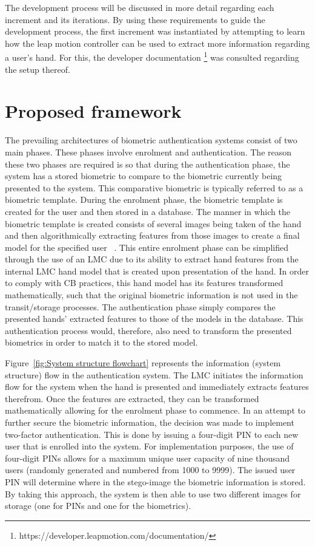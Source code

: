 	
The development process will be discussed in more detail regarding each increment and its iterations.
By using these requirements to guide the development process, the first increment was instantiated by attempting to learn how the leap motion controller can be used to extract more information regarding a user’s hand. For this, the developer documentation \footnote{https://developer.leapmotion.com/documentation/} was consulted regarding the setup thereof.

\section{Proposed framework}

The prevailing architectures of biometric authentication systems consist of two main phases. These phases involve enrolment and authentication. The reason these two phases are required is so that during the authentication phase, the system has a stored biometric to compare to the biometric currently being presented to the system. This comparative biometric is typically referred to as a biometric template. During the enrolment phase, the biometric template is created for the user and then stored in a database. The manner in which the biometric template is created consists of several images being taken of the hand and then algorithmically extracting features from those images to create a final model for the specified user ~\citep{Varchol2007}. This entire enrolment phase can be simplified through the use of an LMC due to its ability to extract hand features from the internal LMC hand model that is created upon presentation of the hand. In order to comply with CB practices, this hand model has its features transformed mathematically, such that the original biometric information is not used in the transit/storage processes. The authentication phase simply compares the presented hands’ extracted features to those of the models in the database. This authentication process would, therefore, also need to transform the presented biometrics in order to match it to the stored model.

Figure~\ref{fig:System structure flowchart} represents the information (system structure) flow in the authentication system. The LMC initiates the information flow for the system when the hand is presented and immediately extracts features therefrom. Once the features are extracted, they can be transformed mathematically allowing for the enrolment phase to commence. In an attempt to further secure the biometric information, the decision was made to implement two-factor authentication. This is done by issuing a four-digit PIN to each new user that is enrolled into the system. For implementation purposes, the use of four-digit PINs allows for a maximum unique user capacity of nine thousand users (randomly generated and numbered from 1000 to 9999). The issued user PIN will determine where in the stego-image the biometric information is stored. By taking this approach, the system is then able to use two different images for storage (one for PINs and one for the biometrics). 

